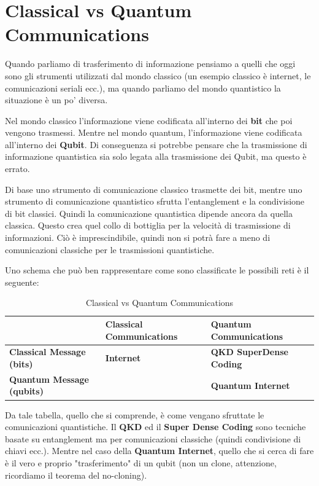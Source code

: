 \section{Classical vs Quantum Communications}
Quando parliamo di trasferimento di informazione pensiamo a quelli che oggi sono gli strumenti utilizzati dal mondo classico (un esempio classico è internet, le comunicazioni seriali ecc.), ma quando parliamo del mondo quantistico la situazione è un po' diversa.

Nel mondo classico l'informazione viene codificata all'interno dei \textbf{bit} che poi vengono trasmessi. Mentre nel mondo quantum, l'informazione viene codificata all'interno dei \textbf{Qubit}. Di conseguenza si potrebbe pensare che la trasmissione di informazione quantistica sia solo legata alla trasmissione dei Qubit, ma questo è errato.

Di base uno strumento di comunicazione classico trasmette dei bit, mentre uno strumento di comunicazione quantistico sfrutta l'entanglement e la condivisione di bit classici. Quindi la comunicazione quantistica dipende ancora da quella classica. Questo crea quel collo di bottiglia per la velocità di trasmissione di informazioni. Ciò è imprescindibile, quindi non si potrà fare a meno di comunicazioni classiche per le trasmissioni quantistiche. 

Uno schema che può ben rappresentare come sono classificate le possibili reti è il seguente:

\begin{table}[h]
\centering
\begin{tabular}{|>{\centering\arraybackslash}p{3cm}|>{\centering\arraybackslash}p{3.5cm}|>{\centering\arraybackslash}p{3.5cm}|}
\hline
 & \textbf{Classical Communications} & \textbf{Quantum Communications} \\
\hline
\textbf{Classical Message (bits)} & \textbf{Internet} & \textbf{QKD \newline SuperDense Coding} \\
\hline
\textbf{Quantum Message (qubits)} & & \textbf{Quantum Internet} \\
\hline
\end{tabular}
\caption{Classical vs Quantum Communications}
\end{table}

Da tale tabella, quello che si comprende, è come vengano sfruttate le comunicazioni quantistiche. Il \textbf{QKD} ed il \textbf{Super Dense Coding} sono tecniche basate su entanglement ma per comunicazioni classiche (quindi condivisione di chiavi ecc.). Mentre nel caso della \textbf{Quantum Internet}, quello che si cerca di fare è il vero e proprio "trasferimento" di un qubit (non un clone, attenzione, ricordiamo il teorema del no-cloning).

